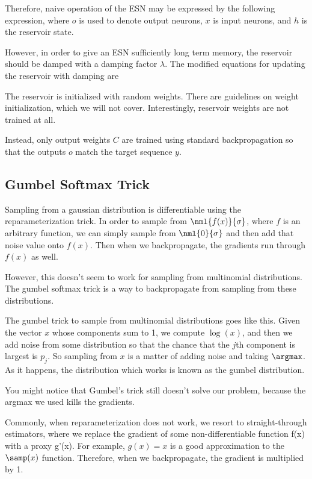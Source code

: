 \documentclass[12pt]{article}
\begin{document}
Therefore, naive operation of the ESN may be expressed by the following expression, where $o$ is used to denote output neurons, $x$ is input neurons, and $h$ is the reservoir state.


However, in order to give an ESN sufficiently long term memory, the reservoir should be damped with a damping factor $\lambda$. The modified equations for updating the reservoir with damping are


The reservoir is initialized with random weights. There are guidelines on weight initialization, which we will not cover. Interestingly, reservoir weights are not trained at all.

Instead, only output weights $C$ are trained using standard backpropagation so that the outputs $o$ match the target sequence $y$. 

\subsection{Gumbel Softmax Trick}

Sampling from a gaussian distribution is differentiable using the reparameterization trick. In order to sample from $\nml{f(x)}{\sigma}$, where $f$ is an arbitrary function, we can simply sample from $\nml{0}{\sigma}$ and then add that noise value onto $f(x)$. Then when we backpropagate, the gradients run through $f(x)$ as well.

However, this doesn't seem to work for sampling from multinomial distributions. The gumbel softmax trick is a way to backpropagate from sampling from these distributions. 

The gumbel trick to sample from multinomial distributions goes like this. Given the vector $x$ whose components sum to 1, we compute $\log(x)$, and then we add noise from some distribution so that the chance that the $j$th component is largest is $p_j$. So sampling from $x$ is a matter of adding noise and taking $\argmax$. As it happens, the distribution which works is known as the gumbel distribution.

You might notice that Gumbel's trick still doesn't solve our problem, because the argmax we used kills the gradients. 

Commonly, when reparameterization does not work, we resort to straight-through estimators, where we replace the gradient of some non-differentiable function f(x) with a proxy g'(x). For example, $g(x) = x$ is a good approximation to the $\samp(x)$ function. Therefore, when we backpropagate, the gradient is multiplied by 1.
\end{document}
